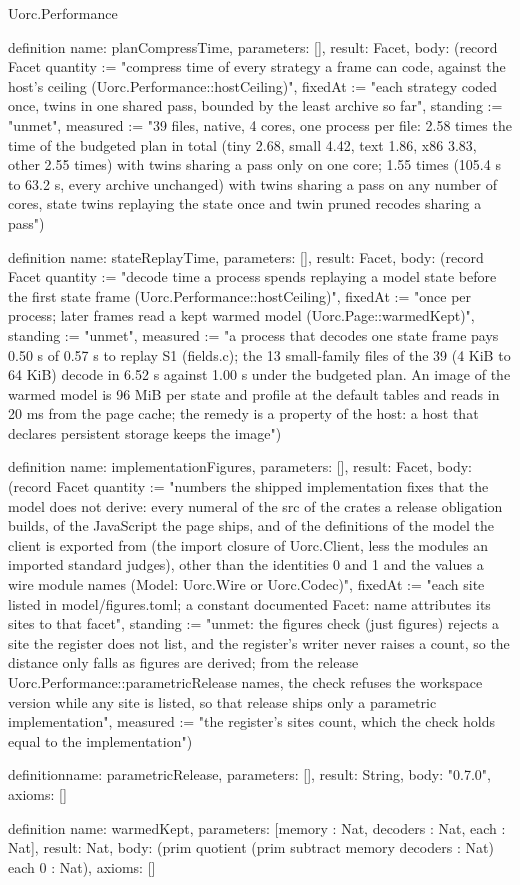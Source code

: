 \begin{lexlean}{Uorc.Performance}
\begin{semanticmodule}
definition{
  name: planCompressTime,
  parameters: [],
  result: Facet,
  body: (record Facet {quantity := "compress time of every strategy a frame can code, against the host's ceiling (Uorc.Performance::hostCeiling)", fixedAt := "each strategy coded once, twins in one shared pass, bounded by the least archive so far", standing := "unmet", measured := "39 files, native, 4 cores, one process per file: 2.58 times the time of the budgeted plan in total (tiny 2.68, small 4.42, text 1.86, x86 3.83, other 2.55 times) with twins sharing a pass only on one core; 1.55 times (105.4 s to 63.2 s, every archive unchanged) with twins sharing a pass on any number of cores, state twins replaying the state once and twin pruned recodes sharing a pass"})
}

definition{
  name: stateReplayTime,
  parameters: [],
  result: Facet,
  body: (record Facet {quantity := "decode time a process spends replaying a model state before the first state frame (Uorc.Performance::hostCeiling)", fixedAt := "once per process; later frames read a kept warmed model (Uorc.Page::warmedKept)", standing := "unmet", measured := "a process that decodes one state frame pays 0.50 s of 0.57 s to replay S1 (fields.c); the 13 small-family files of the 39 (4 KiB to 64 KiB) decode in 6.52 s against 1.00 s under the budgeted plan. An image of the warmed model is 96 MiB per state and profile at the default tables and reads in 20 ms from the page cache; the remedy is a property of the host: a host that declares persistent storage keeps the image"})
}

definition{
  name: implementationFigures,
  parameters: [],
  result: Facet,
  body: (record Facet {quantity := "numbers the shipped implementation fixes that the model does not derive: every numeral of the src of the crates a release obligation builds, of the JavaScript the page ships, and of the definitions of the model the client is exported from (the import closure of Uorc.Client, less the modules an imported standard judges), other than the identities 0 and 1 and the values a wire module names (Model: Uorc.Wire or Uorc.Codec)", fixedAt := "each site listed in model/figures.toml; a constant documented Facet: name attributes its sites to that facet", standing := "unmet: the figures check (just figures) rejects a site the register does not list, and the register's writer never raises a count, so the distance only falls as figures are derived; from the release Uorc.Performance::parametricRelease names, the check refuses the workspace version while any site is listed, so that release ships only a parametric implementation", measured := "the register's sites count, which the check holds equal to the implementation"})
}

definition{name: parametricRelease, parameters: [], result: String, body: "0.7.0", axioms: []}

definition{
  name: warmedKept,
  parameters: [memory : Nat, decoders : Nat, each : Nat],
  result: Nat,
  body: (prim quotient (prim subtract memory decoders : Nat) each 0 : Nat),
  axioms: []
}
\end{semanticmodule}
\end{lexlean}
